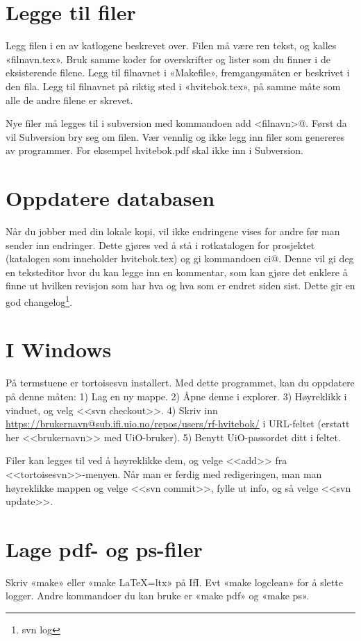 \documentclass[11pt,norsk,a4paper,pointlessnumbers]{scrbook}
\begin{document}
\section{Legge til filer}
Legg filen i en av katlogene beskrevet over. Filen må være ren tekst,
og kalles «filnavn.tex». Bruk samme koder for overskrifter og lister
som du finner i de eksisterende filene. Legg til filnavnet i «Makefile»,
fremgangsmåten er beskrivet i den fila. Legg til filnavnet på riktig
sted i «hvitebok.tex», på samme måte som alle de andre filene er skrevet.

Nye filer må legges til i subversion med kommandoen \verb@svn add <filnavn>@.
Først da vil Subversion bry seg om filen. Vær vennlig og ikke legg inn filer
som genereres av programmer. For eksempel hvitebok.pdf skal ikke inn i Subversion.

\section{Oppdatere databasen}
Når du jobber med din lokale kopi, vil ikke endringene vises for andre før man
sender inn endringer. Dette gjøres ved å stå i rotkatalogen for prosjektet (katalogen
som inneholder hvitebok.tex) og gi kommandoen \verb@svn ci@. Denne vil gi deg en teksteditor
hvor du kan legge inn en kommentar, som kan gjøre det enklere å finne ut hvilken revisjon
som har hva og hva som er endret siden sist. Dette gir en god changelog\footnote{svn log}.

\section{I Windows}
På termstuene er tortoisesvn installert. Med dette programmet, kan du oppdatere på denne måten:
1) Lag en ny mappe. 2) Åpne denne i explorer. 3) Høyreklikk i vinduet, og velg <<svn checkout>>.
4) Skriv inn \url{https://brukernavn@sub.ifi.uio.no/repos/users/rf-hvitebok/} i URL-feltet (erstatt
her <<brukernavn>> med UiO-bruker). 5) Benytt UiO-passordet ditt i feltet.

Filer kan legges til ved å høyreklikke dem, og velge <<add>> fra <<tortoisesvn>>-menyen. Når man er
ferdig med redigeringen, man man høyreklikke mappen og velge <<svn commit>>, fylle ut info, og så
velge <<svn update>>.

\section{Lage pdf- og ps-filer}
Skriv «make» eller «make LaTeX=ltx» på IfI.
Evt «make logclean» for å slette logger.
Andre kommandoer du kan bruke er «make pdf» og «make ps».
\end{document}
